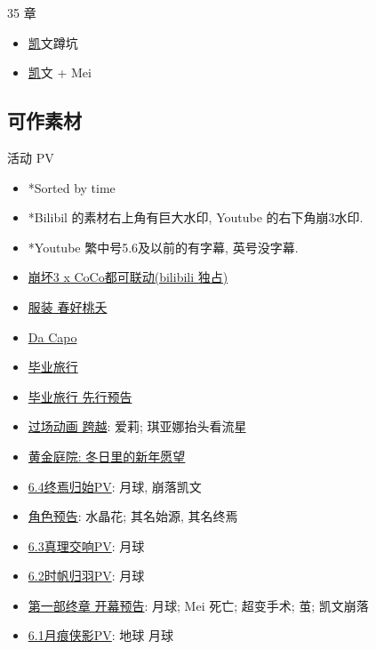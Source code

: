 \documentclass[a4paper]{article}
\begin{document}
35 章

\begin{itemize}
    \item \href{https://www.bilibili.com/video/BV1BT411S7q4/?t=122} 凯文蹲坑
    \item \href{https://www.bilibili.com/video/BV1BT411S7q4/?p=5&t=3265} 凯文 + Mei
\end{itemize}

\subsection{可作素材}

活动 PV

\begin{itemize}
    \item *Sorted by time
    \item *Bilibil 的素材右上角有巨大水印, Youtube 的右下角崩3水印.
    \item *Youtube 繁中号5.6及以前的有字幕, 英号没字幕.
    \item \href{https://www.bilibili.com/video/BV1j84y1D7uf/}{崩坏3 x CoCo都可联动(bilibili 独占)}
    \item \href{https://www.bilibili.com/video/BV1tP411f7BY/}{服装 春好桃夭}
    \item \href{https://www.bilibili.com/video/BV1aM4y1R77W/}{Da Capo}
    \item \href{https://www.bilibili.com/video/BV1Kj411g7Lu/}{毕业旅行}
    \item \href{https://www.bilibili.com/video/BV1BD4y1g7Yp/}{毕业旅行 先行预告}
    \item \href{https://www.bilibili.com/video/BV1784y1p7vM/}{过场动画 跨越}: 爱莉; 琪亚娜抬头看流星
    \item \href{https://www.bilibili.com/video/BV1oA411o7zD/}{黄金庭院: 冬日里的新年愿望}
    \item \href{https://www.bilibili.com/video/BV12g411H7sC/}{6.4终焉归始PV}: 月球, 崩落凯文
    \item \href{https://www.bilibili.com/video/BV1jW4y1K7mE/}{角色预告}: 水晶花; 其名始源, 其名终焉
    \item \href{https://www.bilibili.com/video/BV12g411H7sC/}{6.3真理交响PV}: 月球
    \item \href{https://www.bilibili.com/video/BV1vY411f7qz/}{6.2时帆归羽PV}: 月球
    \item \href{https://www.bilibili.com/video/BV1eV4y1K7c7/}{第一部终章 开幕预告}: 月球; Mei 死亡; 超变手术; 茧; 凯文崩落
    \item \href{https://www.bilibili.com/video/BV1dd4y1B7Xb/}{6.1月痕侠影PV}: 地球 月球

\end{itemize}
\end{document}
